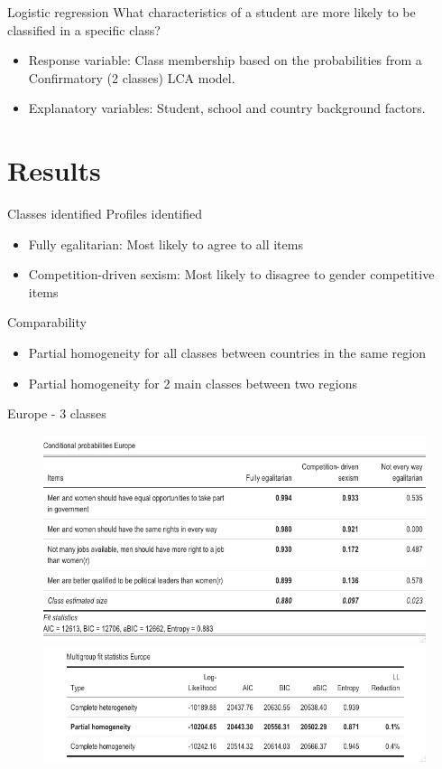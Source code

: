 \documentclass[11pt,t]{beamer}
\begin{document}
\begin{frame}{Logistic regression}   
\vspace{2.1mm} 
What characteristics of a student are more likely to be classified in a specific class?
\begin{itemize}
	\item Response variable: Class membership based on the probabilities from a Confirmatory (2 classes) LCA model.
	\vspace{2.1mm} 
	\item Explanatory variables: Student, school and country background factors. 
\end{itemize}
\end{frame}

\section{Results}

\begin{frame}{Classes identified}
	\vspace{2.1mm} 
Profiles identified
\begin{itemize}
\item Fully egalitarian: Most likely to agree to all items
\item Competition-driven sexism: Most likely to disagree to gender competitive items
\end{itemize}
	\vspace{2.1mm} 
Comparability
\begin{itemize}
\item Partial homogeneity for all classes between countries in the same region
\item Partial homogeneity for 2 main classes between two regions
\end{itemize}
\end{frame} 

\begin{frame}{Europe - 3 classes}
	
\begin{figure}
	\centering
	\includegraphics[height=0.4\textwidth]{graphics/prob_eu.png}\\
	\includegraphics[height=0.2\textwidth]{graphics/mg_eu.png}
\end{figure}
	
\end{frame} 
\end{document}
